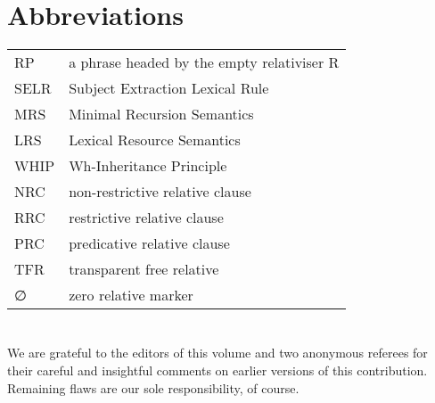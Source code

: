 \documentclass[output=paper,biblatex,babelshorthands,newtxmath,draftmode,colorlinks,citecolor=brown]{langscibook}
\begin{document}

\section*{Abbreviations}

\begin{tabularx}{.99\textwidth}{@{}lX}
RP & a phrase headed by the empty relativiser R\\
SELR & Subject Extraction Lexical Rule         \\            
MRS & Minimal Recursion Semantics              \\            
LRS & Lexical Resource Semantics               \\            
WHIP &  Wh-Inheritance Principle                \\             
NRC & non-restrictive relative clause           \\             
RRC & restrictive relative clause               \\             
PRC & predicative relative clause               \\             
TFR & transparent free relative                 \\             
∅   & zero relative marker
\end{tabularx}





\section*{\acknowledgmentsEN}

We are grateful to the editors of this volume and two anonymous referees for their careful
and insightful comments on earlier versions of this contribution. Remaining flaws are our
sole responsibility, of course.


{\sloppy 
\printbibliography[heading=subbibliography,notkeyword=this] 
}
\end{document}

